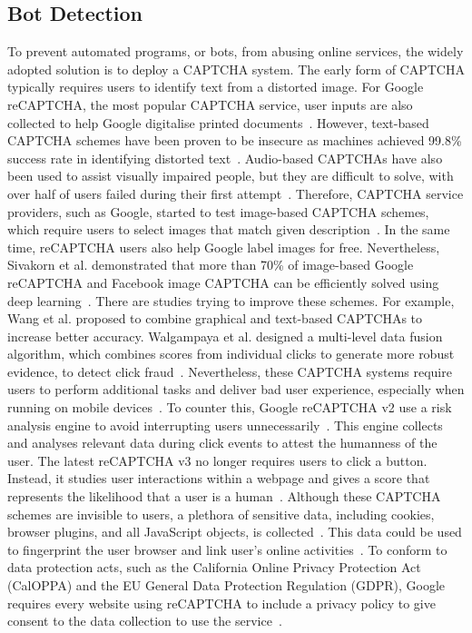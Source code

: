 \subsection{Bot Detection}

To prevent automated programs, or bots, from abusing online services, the widely adopted solution is to deploy a CAPTCHA system. The early form of CAPTCHA typically requires users to identify text from a distorted image. For Google reCAPTCHA, the most popular CAPTCHA service, user inputs are also collected to help Google digitalise printed documents~\cite{von2008recaptcha}. However, text-based CAPTCHA schemes have been proven to be insecure as machines achieved 99.8\% success rate in identifying distorted text~\cite{yan2008low,5395072,goodfellow2013multi}. Audio-based CAPTCHAs have also been used to assist visually impaired people, but they are difficult to solve, with over half of users failed during their first attempt~\cite{tasidou2012user}. Therefore, CAPTCHA service providers, such as Google, started to test image-based CAPTCHA schemes, which require users to select images that match given description~\cite{Google2014}. In the same time, reCAPTCHA users also help Google label images for free. Nevertheless, Sivakorn et al. demonstrated that more than 70\% of image-based Google reCAPTCHA and Facebook image CAPTCHA can be efficiently solved using deep learning~\cite{sivakorn2016robot,Zhou:2018:BGR:3280489.3280510}. There are studies trying to improve these schemes. For example, Wang et al. proposed to combine graphical and text-based CAPTCHAs to increase better accuracy. Walgampaya et al. designed a multi-level data fusion algorithm, which combines scores from individual clicks to generate more robust evidence, to detect click fraud~\cite{walgampaya2010real}. Nevertheless, these CAPTCHA systems require users to perform additional tasks and deliver bad user experience, especially when running on mobile devices~\cite{reynaga2013usability}. To counter this, Google reCAPTCHA v2 use a risk analysis engine to avoid interrupting users unnecessarily~\cite{Google2019}. This engine collects and analyses relevant data during click events to attest the humanness of the user. The latest reCAPTCHA v3 no longer requires users to click a button. Instead, it studies user interactions within a webpage and gives a score that represents the likelihood that a user is a human~\cite{Google2018}. Although these CAPTCHA schemes are invisible to users, a plethora of sensitive data, including cookies, browser plugins, and all JavaScript objects, is collected~\cite{LaraOReilly2015}. This data could be used to fingerprint the user browser and link user's online activities~\cite{gulyas2018extend,vastel2018fp}. To conform to data protection acts, such as the California Online Privacy Protection Act (CalOPPA) and the EU General Data Protection Regulation (GDPR), Google requires every website using reCAPTCHA to include a privacy policy to give consent to the data collection to use the service~\cite{Pegarella2018}.


